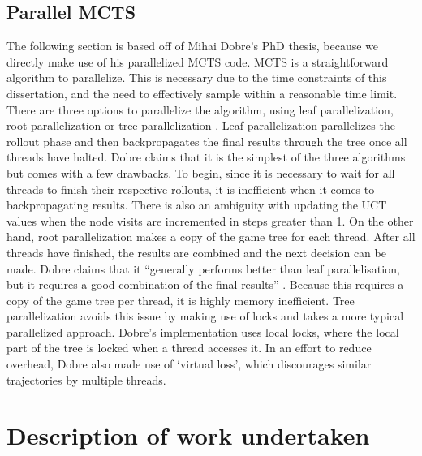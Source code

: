 \documentclass[msc, ai, twoside, notimes, logo, parskip, leftchapter, normalheadings]{infthesis}
\begin{document}
\section{Parallel MCTS}
The following section is based off of Mihai Dobre's PhD thesis, because we directly make use of his parallelized MCTS code. MCTS is a straightforward algorithm to parallelize. This is necessary due to the time constraints of this dissertation, and the need to effectively sample within a reasonable time limit. There are three options to parallelize the algorithm, using leaf parallelization, root parallelization or tree parallelization \citep{Mihai}. Leaf parallelization parallelizes the rollout phase and then backpropagates the final results through the tree once all threads have halted. Dobre claims that it is the simplest of the three algorithms but comes with a few drawbacks. To begin, since it is necessary to wait for all threads to finish their respective rollouts, it is inefficient when it comes to backpropagating results. There is also an ambiguity with updating the UCT values when the node visits are incremented in steps greater than 1. On the other hand, root parallelization makes a copy of the game tree for each thread. After all threads have finished, the results are combined and the next decision can be made. Dobre claims that it ``generally performs better than leaf parallelisation, but it requires a good combination of the final results'' \citep{Mihai}. Because this requires a copy of the game tree per thread, it is highly memory inefficient. Tree parallelization avoids this issue by making use of locks and takes a more typical parallelized approach. Dobre's implementation uses local locks, where the local part of the tree is locked when a thread accesses it. In an effort to reduce overhead, Dobre also made use of `virtual loss', which discourages similar trajectories by multiple threads.

\chapter{Description of work undertaken}
\end{document}

